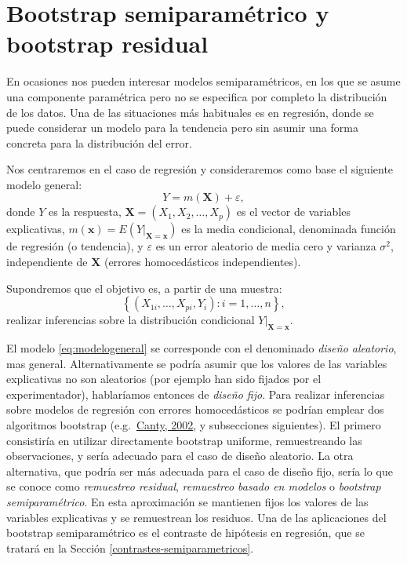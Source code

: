 \documentclass[
]{book}
\theoremstyle{break}
\theoremstyle{definition}
\theoremstyle{definition}
\theoremstyle{definition}
\theoremstyle{definition}
\theoremstyle{remark}
\begin{document}
\hypertarget{boot-reg}{%
\section{Bootstrap semiparamétrico y bootstrap residual}\label{boot-reg}}

En ocasiones nos pueden interesar modelos semiparamétricos, en los que se asume una componente paramétrica pero no se especifica por completo la distribución de los datos.
Una de las situaciones más habituales es en regresión, donde se puede considerar un modelo para la tendencia pero sin asumir una forma concreta para la distribución del error.

Nos centraremos en el caso de regresión y consideraremos como base el siguiente modelo general:
\begin{equation} 
  Y = m(\mathbf{X}) + \varepsilon,
  \label{eq:modelogeneral}
\end{equation}
donde \(Y\) es la respuesta, \(\mathbf{X}=(X_1, X_2, \ldots, X_p)\) es el vector de variables explicativas, \(m(\mathbf{x}) = E\left( \left. Y\right\vert_{\mathbf{X}=\mathbf{x}} \right)\) es la media condicional, denominada función de regresión (o tendencia), y \(\varepsilon\) es un error aleatorio de media cero y varianza \(\sigma^2\), independiente de \(\mathbf{X}\) (errores homocedásticos independientes).

Supondremos que el objetivo es, a partir de una muestra:
\[\left\{ \left( X_{1i}, \ldots, X_{pi}, Y_{i} \right)  : i = 1, \ldots, n \right\},\]
realizar inferencias sobre la distribución condicional
\(\left.Y \right\vert_{\mathbf{X}=\mathbf{x}}\).

El modelo \eqref{eq:modelogeneral} se corresponde con el denominado \emph{diseño aleatorio}, mas general.
Alternativamente se podría asumir que los valores de las variables explicativas no son aleatorios (por ejemplo han sido fijados por el experimentador), hablaríamos entonces de \emph{diseño fijo}.
Para realizar inferencias sobre modelos de regresión con errores homocedásticos se podrían emplear dos algoritmos bootstrap (e.g.~\href{http://cran.fhcrc.org/doc/Rnews/Rnews_2002-3.pdf}{Canty, 2002}, y subsecciones siguientes).
El primero consistiría en utilizar directamente bootstrap uniforme, remuestreando las observaciones, y sería adecuado para el caso de diseño aleatorio.
La otra alternativa, que podría ser más adecuada para el caso de diseño fijo, sería lo que se conoce como \emph{remuestreo residual}, \emph{remuestreo basado en modelos} o \emph{bootstrap semiparamétrico}.
En esta aproximación se mantienen fijos los valores de las variables explicativas y se remuestrean los residuos.
Una de las aplicaciones del bootstrap semiparamétrico es el contraste de hipótesis en regresión, que se tratará en la Sección \ref{contrastes-semiparametricos}.
\end{document}
